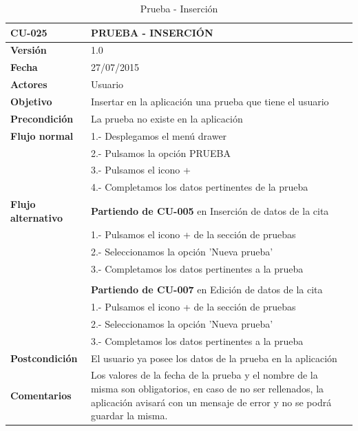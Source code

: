 \documentclass[../pfc.tex]{subfiles}
\begin{document}
	\begin{table}[H]
		\centering
		\begin{tabular}[t]{|p{3cm}|p{9.5cm}|}
			\hline \textbf{CU-025} & \textbf{PRUEBA - INSERCIÓN} \\*
			\hline\hline \textbf{Versión} & 1.0 \\*
			\hline\hline \textbf{Fecha} & 27/07/2015 \\*
			\hline\textbf{Actores} 	& Usuario\\*
			\hline \textbf{Objetivo} & Insertar en la aplicación una prueba que tiene el usuario\\* 			
			\hline \textbf{Precondición} & La prueba no existe en la aplicación\\* 
			\hline \textbf{Flujo normal} & 1.- Desplegamos el menú drawer \\* 
			& 2.- Pulsamos la opción PRUEBA\\*	
			& 3.- Pulsamos el icono +\\*	
			& 4.- Completamos los datos pertinentes de la prueba\\*	
			\hline \textbf{Flujo alternativo} & \textbf{Partiendo de CU-005} en Inserción de datos de la cita\\* 
			& 1.- Pulsamos el icono + de la sección de pruebas\\*	
			& 2.- Seleccionamos la opción 'Nueva prueba'\\*
			& 3.- Completamos los datos pertinentes a la prueba\\*
			& \\*
			& \textbf{Partiendo de CU-007} en Edición de datos de la cita\\* 
			& 1.- Pulsamos el icono + de la sección de pruebas\\*	
			& 2.- Seleccionamos la opción 'Nueva prueba'\\*
			& 3.- Completamos los datos pertinentes a la prueba\\*
			\hline \textbf{Postcondición} & El usuario ya posee los datos de la prueba en la aplicación \\* 
			\hline \textbf{Comentarios}   & Los valores de la fecha de la prueba y el nombre de la misma son obligatorios, en caso de no ser rellenados, la aplicación avisará con un mensaje de error y no se podrá guardar la misma.\\*
			\hline
		\end{tabular}
		\caption{Prueba - Inserción}
		\label{tabla:caso025}
	\end{table}
	
\end{document}
